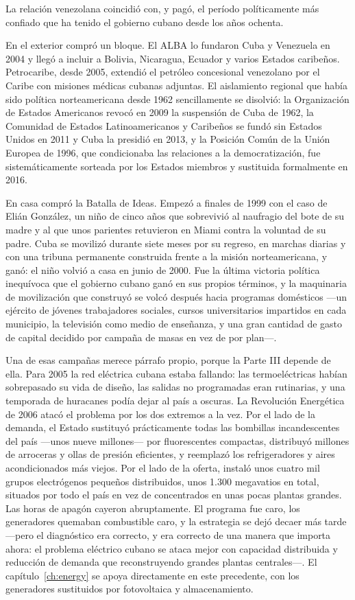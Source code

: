 La relación venezolana coincidió con, y pagó, el período políticamente más
confiado que ha tenido el gobierno cubano desde los años ochenta.

En el exterior compró un bloque. El ALBA lo fundaron Cuba y Venezuela en 2004 y
llegó a incluir a Bolivia, Nicaragua, Ecuador y varios Estados caribeños.
Petrocaribe, desde 2005, extendió el petróleo concesional venezolano por el Caribe
con misiones médicas cubanas adjuntas. El aislamiento regional que había sido
política norteamericana desde 1962 sencillamente se disolvió: la Organización de
Estados Americanos revocó en 2009 la suspensión de Cuba de 1962, la Comunidad de
Estados Latinoamericanos y Caribeños se fundó sin Estados Unidos en 2011 y Cuba la
presidió en 2013, y la Posición Común de la Unión Europea de 1996, que condicionaba
las relaciones a la democratización, fue sistemáticamente sorteada por los Estados
miembros y sustituida formalmente en 2016.

En casa compró la Batalla de Ideas. Empezó a finales de 1999 con el caso de Elián
González, un niño de cinco años que sobrevivió al naufragio del bote de su madre y
al que unos parientes retuvieron en Miami contra la voluntad de su padre. Cuba se
movilizó durante siete meses por su regreso, en marchas diarias y con una tribuna
permanente construida frente a la misión norteamericana, y ganó: el niño volvió a
casa en junio de 2000. Fue la última victoria política inequívoca que el gobierno
cubano ganó en sus propios términos, y la maquinaria de movilización que construyó
se volcó después hacia programas domésticos ---un ejército de jóvenes trabajadores
sociales, cursos universitarios impartidos en cada municipio, la televisión como
medio de enseñanza, y una gran cantidad de gasto de capital decidido por campaña de
masas en vez de por plan---.

Una de esas campañas merece párrafo propio, porque la Parte III depende de ella.
Para 2005 la red eléctrica cubana estaba fallando: las termoeléctricas habían
sobrepasado su vida de diseño, las salidas no programadas eran rutinarias, y una
temporada de huracanes podía dejar al país a oscuras. La Revolución Energética de
2006 atacó el problema por los dos extremos a la vez. Por el lado de la demanda, el
Estado sustituyó prácticamente todas las bombillas incandescentes del país ---unos
nueve millones--- por fluorescentes compactas, distribuyó millones de arroceras y
ollas de presión eficientes, y reemplazó los refrigeradores y aires acondicionados
más viejos. Por el lado de la oferta, instaló unos cuatro mil grupos electrógenos
pequeños distribuidos, unos 1.300 megavatios en total, situados por todo el país
en vez de concentrados en unas pocas plantas grandes.\unv{} Las horas de apagón
cayeron abruptamente. El programa fue caro, los generadores quemaban combustible
caro, y la estrategia se dejó decaer más tarde ---pero el diagnóstico era correcto,
y era correcto de una manera que importa ahora: el problema eléctrico cubano se
ataca mejor con capacidad distribuida y reducción de demanda que reconstruyendo
grandes plantas centrales---. El capítulo~\ref{ch:energy} se apoya directamente en
este precedente, con los generadores sustituidos por fotovoltaica y almacenamiento.

